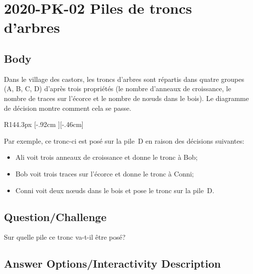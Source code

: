 \documentclass[a4paper,11pt]{report}
\newcommand{\taskGraphicsFolder}{..}
\begin{document}
\section*{\centering{} 2020-PK-02 Piles de troncs d’arbres}


\subsection*{Body}

Dans le village des castors, les troncs d’arbres sont répartis dans quatre groupes (A, B, C, D) d’après trois propriétés (le nombre d’anneaux de croissance, le nombre de traces sur l’écorce et le nombre de nœuds dans le bois). Le diagramme de décision montre comment cela se passe.

{\centering%
\par}

\begin{wrapfigure}{R}{144.3px}
\raisebox{-.46cm}[\dimexpr \height-.92cm \relax][-.46cm]{}
\end{wrapfigure}

Par exemple, ce tronc-ci est posé sur la pile~D en raison des décisions suivantes:

\begin{itemize}
  \item Ali voit trois anneaux de croissance et donne le tronc à Bob;
  \item Bob voit trois traces sur l’écorce et donne le tronc à Conni;
  \item Conni voit deux nœuds dans le bois et pose le tronc sur la pile~D.
\end{itemize}

{\em

\subsection*{Question/Challenge}

Sur quelle pile ce tronc va-t-il être posé?

{\centering%
\par}

}\begingroup
\renewcommand{\arraystretch}{1.5}
\subsection*{Answer Options/Interactivity Description}
\end{document}
